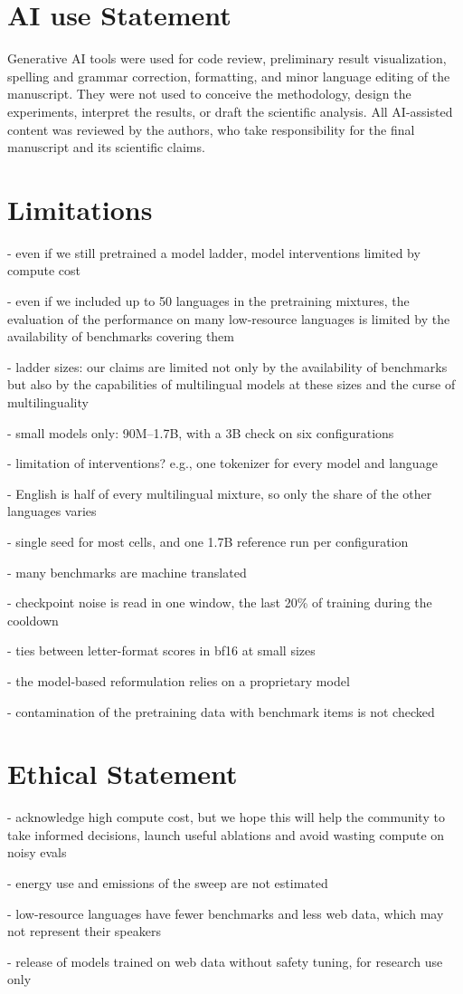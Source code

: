 \section*{AI use Statement}

Generative AI tools were used for code review, preliminary result visualization, spelling and grammar correction, formatting, and minor language editing of the manuscript. 
They were not used to conceive the methodology, design the experiments, interpret the results, or draft the scientific analysis. 
All AI-assisted content was reviewed by the authors, who take responsibility for the final manuscript and its scientific claims.

\section*{Limitations}

- even if we still pretrained a \nmodels model ladder, model interventions limited by compute cost

- even if we included up to 50 languages in the pretraining mixtures, the evaluation of the performance on many low-resource languages is limited by the availability of benchmarks covering them

- ladder sizes: our claims are limited not only by the availability of benchmarks but also by the capabilities of multilingual models at these sizes and the curse of multilinguality

- small models only: 90M--1.7B, with a 3B check on six configurations

- limitation of interventions? e.g., one tokenizer for every model and language

- English is half of every multilingual mixture, so only the share of the other languages varies

- single seed for most cells, and one 1.7B reference run per configuration

- many benchmarks are machine translated

- checkpoint noise is read in one window, the last 20\% of training during the cooldown

- ties between letter-format scores in bf16 at small sizes

- the model-based reformulation relies on a proprietary model

- contamination of the pretraining data with benchmark items is not checked

\section*{Ethical Statement}

- acknowledge high compute cost, but we hope this will help the community to take informed decisions, launch useful ablations and avoid wasting compute on noisy evals

- energy use and emissions of the sweep are not estimated

- low-resource languages have fewer benchmarks and less web data, which may not represent their speakers

- release of models trained on web data without safety tuning, for research use only
